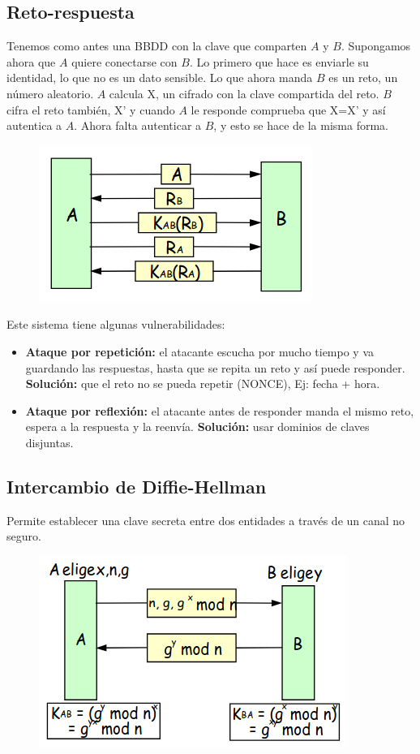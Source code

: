 \subsection{Reto-respuesta}
Tenemos como antes una BBDD con la clave que comparten $A$ y $B$. Supongamos ahora que $A$ quiere conectarse con $B$. Lo primero que hace es enviarle su identidad, lo que no es un dato sensible. Lo que ahora manda $B$ es un reto, un número aleatorio. $A$ calcula X, un cifrado con la clave compartida del reto. $B$ cifra el reto también, X' y cuando $A$ le responde comprueba que X=X' y así autentica a $A$. Ahora falta autenticar a $B$, y esto se hace de la misma forma. 
\begin{figure}[H]
    \centering
    \includegraphics[width=0.4\linewidth]{./images/reto-respuesta.png}
    \label{fig:reto-respuesta}
\end{figure}

Este sistema tiene algunas vulnerabilidades:
\begin{itemize}
    \item \textbf{Ataque por repetición:} el atacante escucha por mucho tiempo y va guardando las respuestas, hasta que se repita un reto y así puede responder. \textbf{Solución:} que el reto no se pueda repetir (NONCE), Ej: fecha + hora. 
    \item \textbf{Ataque por reflexión:} el atacante antes de responder manda el mismo reto, espera a la respuesta y la reenvía. \textbf{Solución:} usar dominios de claves disjuntas.
\end{itemize}

\subsection{Intercambio de Diffie-Hellman}
Permite establecer una clave secreta entre dos entidades a través de un canal no seguro. 
\begin{figure}[H]
    \centering
    \includegraphics[width=0.4\linewidth]{./images/diffie-hellman.png}
    \label{fig:diffie-hellman}
\end{figure}

